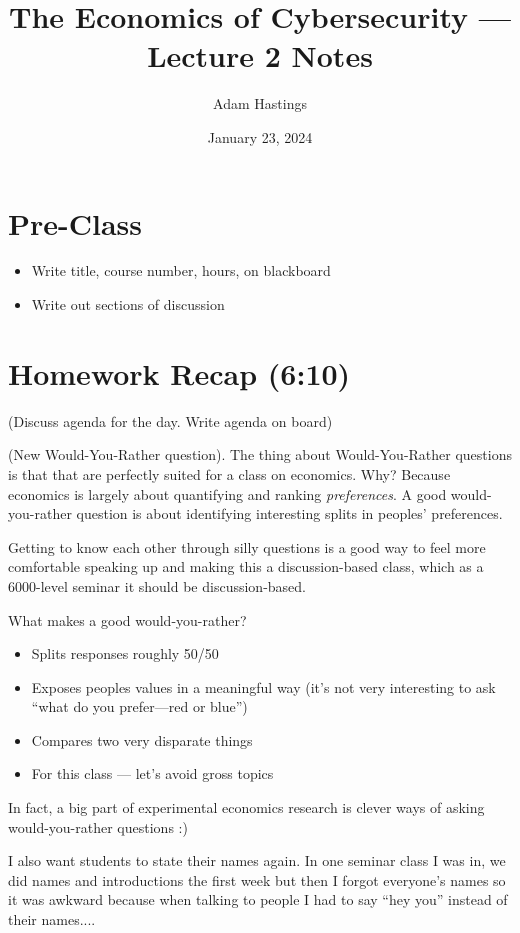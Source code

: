 \documentclass[11pt]{article}
\title{The Economics of Cybersecurity --- Lecture 2 Notes}
\date{January 23, 2024}
\author{Adam Hastings}
\begin{document}
\maketitle

\section*{Pre-Class}
\begin{itemize}
    \item Write title, course number, hours, on blackboard
    \item Write out sections of discussion
\end{itemize}

\section{Homework Recap (6:10)} 

(Discuss agenda for the day. Write agenda on board)

(New Would-You-Rather question). The thing about Would-You-Rather questions is that that are perfectly suited for a class on economics. Why? Because economics is largely about quantifying and ranking {\it preferences}. A good would-you-rather question is about identifying interesting splits in peoples' preferences. 

Getting to know each other through silly questions is a good way to feel more comfortable speaking up and making this a discussion-based class, which as a 6000-level seminar it should be discussion-based. 

What makes a good would-you-rather?

\begin{itemize}
    \item Splits responses roughly 50/50
    \item Exposes peoples values in a meaningful way (it's not very interesting to ask ``what do you prefer---red or blue'')
    \item Compares two very disparate things
    \item For this class --- let's avoid gross topics
\end{itemize}

In fact, a big part of experimental economics research is clever ways of asking would-you-rather questions :) 


I also want students to state their names again. In one seminar class I was in, we did names and introductions the first week but then I forgot everyone's names so it was awkward because when talking to people I had to say ``hey you'' instead of their names.... 
\end{document}
